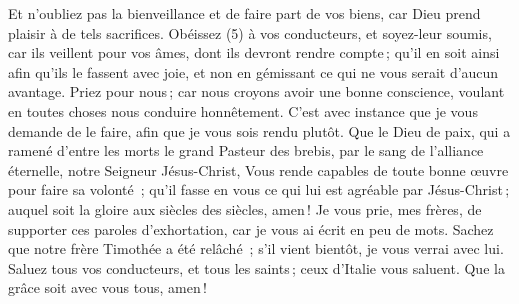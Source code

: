\begin{multicols}{2}
Et n'oubliez pas la bienveillance et de faire part de vos biens, car Dieu prend plaisir à de tels sacrifices.
Obéissez (5) à vos conducteurs, et soyez-leur soumis, car ils veillent pour vos âmes, dont ils devront rendre compte ; qu’il en soit ainsi afin qu’ils le fassent avec joie, et non en gémissant ce qui ne vous serait d’aucun avantage.
Priez pour nous ; car nous croyons avoir une bonne conscience, voulant en toutes choses nous conduire honnêtement.
C’est avec instance que je vous demande de le faire, afin que je vous sois rendu plutôt.
Que le Dieu de paix, qui a ramené d'entre les morts le grand Pasteur des brebis, par le sang de l'alliance éternelle, notre Seigneur Jésus-Christ,
Vous rende capables de toute bonne œuvre pour faire sa volonté ; qu’il fasse en vous ce qui lui est agréable par Jésus-Christ ; auquel soit la gloire aux siècles des siècles, amen !
Je vous prie, mes frères, de supporter ces paroles d'exhortation, car je vous ai écrit en peu de mots.
Sachez que notre frère Timothée a été relâché ; s'il vient bientôt, je vous verrai avec lui.
Saluez tous vos conducteurs, et tous les saints ; ceux d'Italie vous saluent.
Que la grâce soit avec vous tous, amen !
\PPE{}
\end{multicols}
